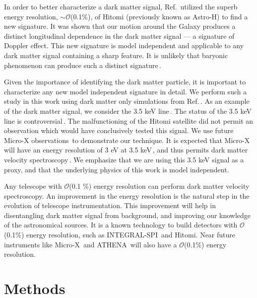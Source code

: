 \documentclass[aps,prl,10pt,twocolumn,superscriptaddress,showpacs]{revtex4-1}
\begin{document}
In order to better characterize a dark matter signal, Ref.\,\cite{speckhard2016} utilized the superb energy resolution, $\sim \mathcal{O}$(0.1\%), of Hitomi (previously known as Astro-H) to find a new signature.  It was shown that our motion around the Galaxy produces a distinct longitudinal dependence in the dark matter signal --- a signature of Doppler effect.  This new signature is model independent and applicable to any dark matter signal containing a sharp feature.  It is unlikely that baryonic phenomenon can produce such a distinct signature\,\cite{speckhard2016}.

Given the importance of identifying the dark matter particle, it is important to characterize any new model independent signature in detail.  We perform such a study in this work using dark matter only simulations from Ref.\,\cite{mao2015}.  As an example of the dark matter signal, we consider the 3.5 keV line\,\cite{Bulbul:2014sua,Boyarsky:2014jta}.  The status of the 3.5 keV line is controversial\,\cite{Iakubovskyi:2015wma,Jeltema:2015mee,Ruchayskiy:2015onc,Bulbul:2016yop,Aharonian:2016gzq,Hofmann:2016urz,Conlon:2016lxl}.  The malfunctioning of the Hitomi satellite did not permit an observation which would have conclusively tested this signal.  We use future Micro-X observations\,\cite{Figueroa-Feliciano:2015gwa} to demonstrate our technique.  It is expected that Micro-X will have an energy resolution of 3 eV at 3.5 keV\,\cite{Figueroa-Feliciano:2015gwa}, and thus permits dark matter velocity spectroscopy\,\cite{speckhard2016}.  We emphasize that we are using this 3.5 keV signal as a proxy, and that the underlying physics of this work is model independent.  

Any telescope with $\mathcal{O}$(0.1 \%) energy resolution can perform dark matter velocity spectroscopy.  An improvement in the energy resolution is the natural step in the evolution of telescope instrumentation.  This improvement will help in disentangling dark matter signal from background, and improving our knowledge of the astronomical sources.  It is a known technology to build detectors with $\mathcal{O}$(0.1\%) energy resolution, such as INTEGRAL-SPI\,\cite{2003AA} and Hitomi.  Near future instruments like Micro-X\,\cite{Figueroa-Feliciano:2015gwa} and ATHENA\,\cite{Barret:2016ett} will also have a $\mathcal{O}$(0.1\%) energy resolution.

\section{Methods}
\label{sec:methods}
\end{document}
